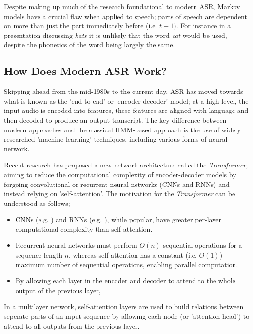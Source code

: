 Despite making up much of the research foundational to modern ASR, Markov models have a crucial flaw when applied to speech; parts of speech are dependent on more than just the part immediately before (i.e. $t-1$).
For instance in a presentation discussing \emph{hats} it is unlikely that the word \emph{cat} would be used, despite the phonetics of the word being largely the same.

\subsection{How Does Modern ASR Work?}

Skipping ahead from the mid-1980s to the current day, ASR has moved towards what is known as the 'end-to-end' or 'encoder-decoder' model;
at a high level, the input audio is encoded into features, these features are aligned with language and then decoded to produce an output transcript\cite{wang2019overview}.
The key difference between modern approaches and the classical HMM-based approach is the use of widely researched 'machine-learning' techniques, including various forms of neural network\cite{mustafa2019comparative, amodei2016deep, hori2017advances, Kim2017Mar}.

Recent research has proposed a new network architecture called the \emph{Transformer}\cite{vaswani2017attention}, aiming to reduce the computational complexity of encoder-decoder models by forgoing convolutional or recurrent neural networks (CNNs and RNNs) and instead relying on 'self-attention'.
The motivation for the \emph{Transformer} can be understood as follows;

\begin{itemize}
        \item CNNs (e.g. \cite{zeghidour2018fully}) and RNNs (e.g. \cite{graves2014towards}), while popular, have greater per-layer computational complexity than self-attention\cite{vaswani2017attention}.
        \item Recurrent neural networks must perform $O(n)$ sequential operations for a sequence length $n$, whereas self-attention has a constant (i.e. $O(1)$) maximum number of sequential operations, enabling parallel computation\cite{vaswani2017attention}.
        \item By allowing each layer in the encoder and decoder to attend to the whole output of the previous layer, 
\end{itemize}

In a multilayer network, self-attention layers are used to build relations between seperate parts of an input sequence by allowing each node (or 'attention head'\cite{shaw2018self}) to attend to all outputs from the previous layer.

